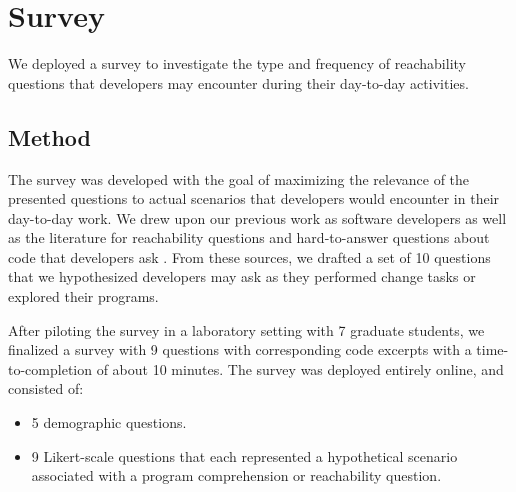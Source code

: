 
\newcommand{\numStarted}{103}
\newcommand{\numFinished}{69}
\newcommand{\writeCodeDaily}{59}
\newcommand{\writeCodeTwoDays}{9}
\newcommand{\writeCodeOnceMonth}{1}

\newcommand{\canada}{21}
\newcommand{\usa}{21}
\newcommand{\germany}{8}
\newcommand{\russia}{8}
\newcommand{\uk}{2}

\newcommand{\zeroToTwo}{26.09}
\newcommand{\twoToFive}{30.43}
\newcommand{\fiveToSeven}{11.59}
\newcommand{\sevenPlus}{31.88}

\newcommand{\java}{14.49}
\newcommand{\kotlin}{13.04}
\newcommand{\python}{14.49}
\newcommand{\cpp}{11.59}
\newcommand{\typescript}{11.59}
\newcommand{\other}{34.80}

\chapter{Survey}
\label{ch:Survey}

\noindent We deployed a survey to investigate the type and frequency of
reachability questions that developers may encounter during their day-to-day 
activities.

\section{Method}
\label{sec:method}

\noindent The survey was developed with the goal of maximizing the relevance of 
the presented questions to actual scenarios that developers would encounter in
their day-to-day work.
We drew upon our previous work as software developers as well as the literature
for reachability questions \cite{latoza-2010-reach} and hard-to-answer
questions about code that developers ask \cite{latoza-2010-hard-questions}.
From these sources, we drafted a set of 10 questions that we hypothesized 
developers may ask as they performed change tasks or explored their programs.

\par After piloting the survey in a laboratory setting with 7 graduate
students, we finalized a survey with 9 questions with corresponding code
excerpts with a time-to-completion of about 10 minutes.
The survey was deployed entirely online, and consisted of:
\begin{itemize}
    \item 5 demographic questions.
    \item 9 Likert-scale questions that each represented a hypothetical 
          scenario associated with a program comprehension or reachability 
          question.
\end{itemize}

